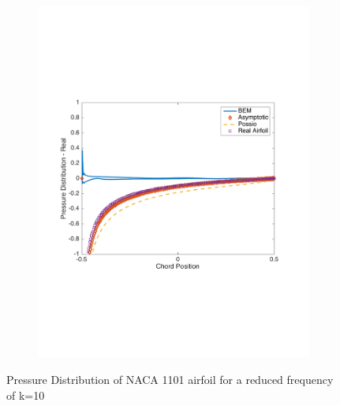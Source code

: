 \documentclass{article}
\begin{document}
\begin{figure}[h]
\begin{subfigure}{0.33\textwidth}
	\includegraphics[width = \textwidth, height=0.16\textheight]{NACA1101_pressure_k10real}
\end{subfigure}%
\caption{Pressure Distribution of NACA 1101 airfoil for a reduced frequency of k=10}
\end{figure}
\end{document}
